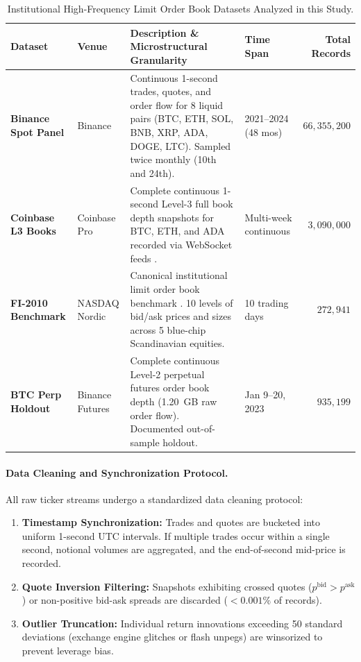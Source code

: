 \documentclass[12pt]{article}
\theoremstyle{definition}
\theoremstyle{remark}
\begin{document}
\begin{table}[htbp]
\centering\footnotesize
\setlength{\tabcolsep}{4pt}
\caption{Institutional High-Frequency Limit Order Book Datasets Analyzed in this Study.}
\label{tab:datasets}
\begin{tabularx}{\textwidth}{p{2.6cm}p{1.8cm}Xp{2.0cm}r}\toprule
Dataset & Venue & Description \& Microstructural Granularity & Time Span & Total Records \\\midrule
\textbf{Binance Spot Panel} & Binance & Continuous 1-second trades, quotes, and order flow for 8 liquid pairs (BTC, ETH, SOL, BNB, XRP, ADA, DOGE, LTC). Sampled twice monthly (10th and 24th). & 2021--2024 (48 mos) & $66{,}355{,}200$ \\
\textbf{Coinbase L3 Books} & Coinbase Pro & Complete continuous 1-second Level-3 full book depth snapshots for BTC, ETH, and ADA recorded via WebSocket feeds \citep{crypto_rl_2021}. & Multi-week continuous & $3{,}090{,}000$ \\
\textbf{FI-2010 Benchmark} & NASDAQ Nordic & Canonical institutional limit order book benchmark \citep{ntakaris2018benchmark}. 10 levels of bid/ask prices and sizes across 5 blue-chip Scandinavian equities. & 10 trading days & $272{,}941$ \\
\textbf{BTC Perp Holdout} & Binance Futures & Complete continuous Level-2 perpetual futures order book depth (1.20~GB raw order flow). Documented out-of-sample holdout. & Jan 9--20, 2023 & $935{,}199$ \\\bottomrule
\end{tabularx}
\end{table}

\paragraph{Data Cleaning and Synchronization Protocol.}
All raw ticker streams undergo a standardized data cleaning protocol:
\begin{enumerate}
    \item \textbf{Timestamp Synchronization:} Trades and quotes are bucketed into uniform 1-second UTC intervals. If multiple trades occur within a single second, notional volumes are aggregated, and the end-of-second mid-price is recorded.
    \item \textbf{Quote Inversion Filtering:} Snapshots exhibiting crossed quotes ($p^{\text{bid}} > p^{\text{ask}}$) or non-positive bid-ask spreads are discarded ($<0.001\%$ of records).
    \item \textbf{Outlier Truncation:} Individual return innovations exceeding 50 standard deviations (exchange engine glitches or flash unpegs) are winsorized to prevent leverage bias.
\end{enumerate}
\end{document}
